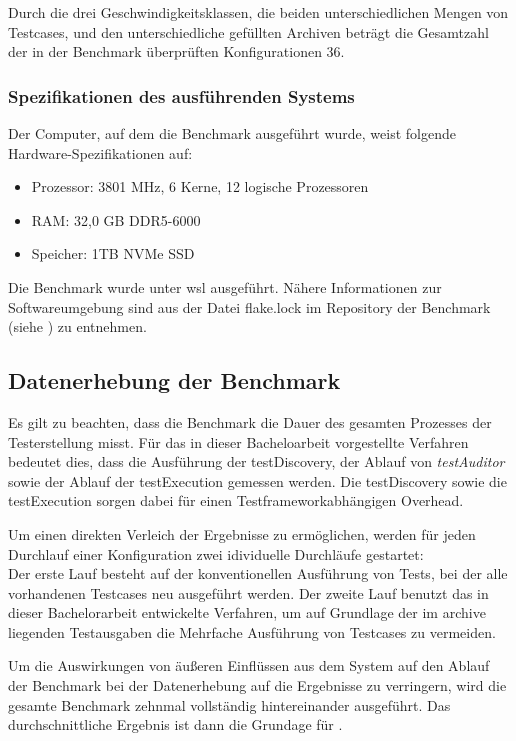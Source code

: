 Durch die drei Geschwindigkeitsklassen, die beiden unterschiedlichen Mengen von Testcases, und den unterschiedliche gefüllten Archiven beträgt die Gesamtzahl der in der Benchmark überprüften Konfigurationen 36. 

\subsubsection{Spezifikationen des ausführenden Systems}
Der Computer, auf dem die Benchmark ausgeführt wurde, weist folgende Hardware-Spezifikationen auf:
\begin{itemize}
    \item Prozessor: 3801 MHz, 6 Kerne, 12 logische Prozessoren
    \item RAM: 32,0 GB DDR5-6000
    \item Speicher: 1TB NVMe SSD
\end{itemize}
Die Benchmark wurde unter wsl ausgeführt. Nähere Informationen zur Softwareumgebung sind aus der Datei flake.lock im Repository der Benchmark (siehe ) zu entnehmen.

\subsection{Datenerhebung der Benchmark}
Es gilt zu beachten, dass die Benchmark die Dauer des gesamten Prozesses der Testerstellung misst. Für das in dieser Bacheloarbeit vorgestellte Verfahren bedeutet dies, dass die Ausführung der testDiscovery, der Ablauf von \textit{testAuditor} sowie der Ablauf der testExecution gemessen werden. Die testDiscovery sowie die testExecution sorgen dabei für einen Testframeworkabhängigen Overhead. 

Um einen direkten Verleich der Ergebnisse zu ermöglichen, werden für jeden Durchlauf einer Konfiguration zwei idividuelle Durchläufe gestartet:\\
Der erste Lauf besteht auf der konventionellen Ausführung von Tests, bei der alle vorhandenen Testcases neu ausgeführt werden. Der zweite Lauf benutzt das in dieser Bachelorarbeit entwickelte Verfahren, um auf Grundlage der im archive liegenden Testausgaben die Mehrfache Ausführung von Testcases zu vermeiden.

Um die Auswirkungen von äußeren Einflüssen aus dem System auf den Ablauf der Benchmark bei der Datenerhebung auf die Ergebnisse zu verringern, wird die gesamte Benchmark zehnmal vollständig hintereinander ausgeführt. Das durchschnittliche Ergebnis ist dann die Grundage für . 


